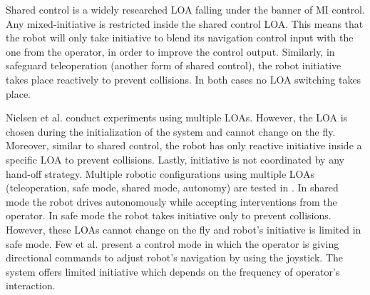 \documentclass[a4paper,12pt,oneside,openright]{bhamthesis}
\begin{document}
Shared control is a widely researched LOA falling under the banner of MI control. Any mixed-initiative is restricted inside the shared control LOA. This means that the robot will only take initiative to blend its navigation control input with the one from the operator, in order to improve the control output. Similarly, in safeguard teleoperation (another form of shared control), the robot initiative takes place reactively to prevent collisions. In both cases no LOA switching takes place.

Nielsen et al. \citep{Nielsen2008} conduct experiments using multiple LOAs. However, the LOA is chosen during the initialization of the system and cannot change on the fly. Moreover, similar to shared control, the robot has only reactive initiative inside a specific LOA to prevent collisions. Lastly, initiative is not coordinated by any hand-off strategy. Multiple robotic configurations using multiple LOAs (teleoperation, safe mode, shared mode, autonomy) are tested in \citep{Bruemmer2005}. In shared mode the robot drives autonomously while accepting interventions from the operator. In safe mode the robot takes initiative only to prevent collisions. However, these LOAs cannot change on the fly and robot's initiative is limited in safe mode. Few et al. \citep{Few2006} present a control mode in which the operator is giving directional commands to adjust robot's navigation by using the joystick. The system offers limited initiative which depends on the frequency of operator's interaction.
\end{document}
